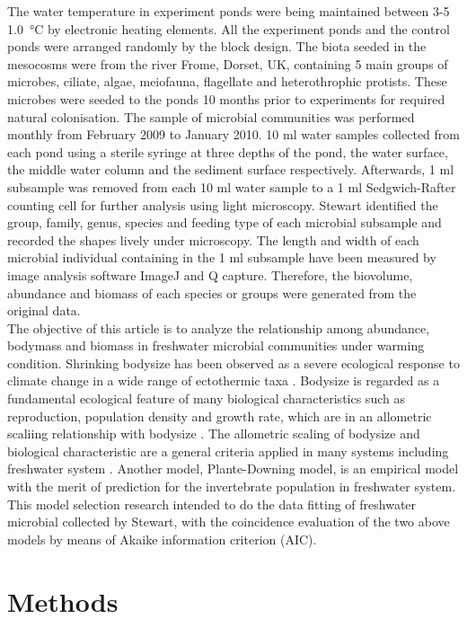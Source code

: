 \documentclass[11pt]{article}
\begin{document}
\begin{linenumbers}
The water temperature in experiment ponds were being maintained between 3-5 \SI{1.0}{\celsius} by electronic heating elements.
All the experiment ponds and the control ponds were arranged randomly by the block design.
The biota seeded in the mesocosms were from the river Frome, Dorset, UK, containing 5 main groups of microbes, ciliate, algae, meiofauna, flagellate and heterothrophic protists.
These microbes were seeded to the ponds 10 months prior to experiments for required natural colonisation. The sample of microbial communities was performed monthly from February 2009 to January 2010.
10 ml water samples collected from each pond using a sterile syringe at three depths of the pond, the water surface, the middle water column and the sediment surface respectively.
Afterwards, 1 ml subsample was removed from each 10 ml water sample to a 1 ml Sedgwich-Rafter counting cell for further analysis using light microscopy.
Stewart identified the group, family, genus, species and feeding type of each microbial subsample and recorded the shapes lively under microscopy.
The length and width of each microbial individual containing in the 1 ml subsample have been measured by image analysis software ImageJ and Q capture.
Therefore, the biovolume, abundance and biomass of each species or groups were generated from the original data. \\
The objective of this article is to analyze the relationship among abundance, bodymass and biomass in freshwater microbial communities under warming condition.
Shrinking bodysize has been observed as a severe ecological response to climate change in a wide range of ectothermic taxa \cite{walters2006temperature}.
Bodysize is regarded as a fundamental ecological feature of many biological characteristics such as reproduction, population density and growth rate, which are in an allometric scaliing relationship with bodysize \cite{peters1983effect}.
The allometric scaling of bodysize and biological characteristic are a general criteria applied in many systems including freshwater system \cite{yvon2011warming}.
Another model, Plante-Downing model, is an empirical model with the merit of prediction for the invertebrate population in freshwater system\cite{plante1989production}.
This model selection research intended to do the data fitting of freshwater microbial collected by Stewart, with the coincidence evaluation of the two above models by means of Akaike information criterion (AIC).

\section*{Methods}

\end{linenumbers}
\end{document}
